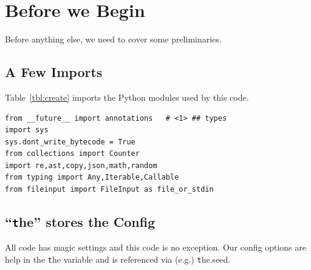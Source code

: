 \documentclass[landscape,	DIV=calc,%
							paper=letter,%
							fontsize=10pt,%
							twocolumn]{scrartcl}	 					%
\begin{document}
%
%
%
%
\section{Before we Begin}
Before anything else, we need to cover some preliminaries.
\subsection{A Few Imports}
Table~\ref{tbl:create} imports the Python modules used by this code.

\begin{table}[!h]
\begin{minipage}{\linewidth}
\begin{lstlisting}[caption={Row creation. And column header creation (from row1)},label={tbl:create}]
from __future__ import annotations   # <1> ## types  
import sys
sys.dont_write_bytecode = True
from collections import Counter
import re,ast,copy,json,math,random
from typing import Any,Iterable,Callable
from fileinput import FileInput as file_or_stdin 
\end{lstlisting}
\end{minipage}
\end{table}

\subsection{``{\texttt the}'' stores the Config }
All code has magic settings and this code is no exception.
Our config options are help in the {\texttt the} variable and is referenced
via (e.g.) {\texttt the.seed}.
\end{document}

